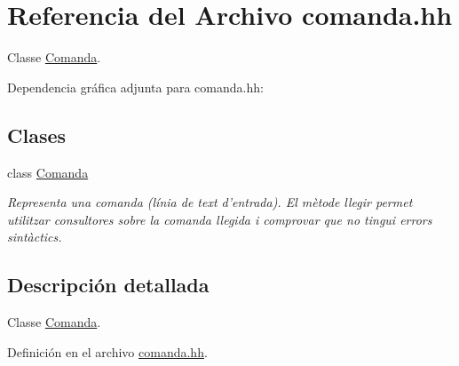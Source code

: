 \hypertarget{comanda_8hh}{\section{Referencia del Archivo comanda.\-hh}
\label{comanda_8hh}
}


Classe \hyperlink{class_comanda}{Comanda}.  


Dependencia gráfica adjunta para comanda.\-hh\-:
\subsection*{Clases}
\begin{DoxyCompactItemize}
\item 
class \hyperlink{class_comanda}{Comanda}
\begin{DoxyCompactList}\small\item\em Representa una comanda (línia de text d'entrada). El mètode llegir permet utilitzar consultores sobre la comanda llegida i comprovar que no tingui errors sintàctics. \end{DoxyCompactList}\end{DoxyCompactItemize}


\subsection{Descripción detallada}
Classe \hyperlink{class_comanda}{Comanda}. 

Definición en el archivo \hyperlink{comanda_8hh_source}{comanda.\-hh}.

